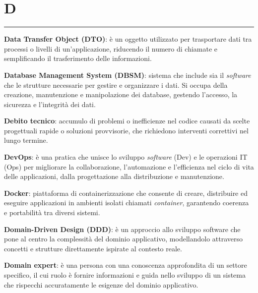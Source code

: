 \section*{D}
{\color{lightgray}\rule{\textwidth}{0.4pt}} %
\begin{glossaryitemize}
    \item \textbf{Data Transfer Object (DTO)}:  è un oggetto utilizzato per trasportare dati tra processi o livelli di un'applicazione, riducendo il numero di chiamate e semplificando il trasferimento delle informazioni.
    \item \textbf{Database Management System (DBSM)}: sistema che include sia il \textit{software} che le strutture necessarie per gestire e organizzare i dati. Si occupa della creazione, manutenzione e manipolazione dei database, gestendo l'accesso, la sicurezza e l'integrità dei dati.
    \item \textbf{Debito tecnico}: accumulo di problemi o inefficienze nel codice causati da scelte progettuali rapide o soluzioni provvisorie, che richiedono interventi correttivi nel lungo termine.
    \item \textbf{DevOps}: è una pratica che unisce lo sviluppo \textit{software} (Dev) e le operazioni IT (Ops) per migliorare la collaborazione, l'automazione e l'efficienza nel ciclo di vita delle applicazioni, dalla progettazione alla distribuzione e manutenzione.
    \item \textbf{Docker}: piattaforma di containerizzazione che consente di creare, distribuire ed eseguire applicazioni in ambienti isolati chiamati \textit{container}, garantendo coerenza e portabilità tra diversi sistemi.
    \item \textbf{Domain-Driven Design (DDD)}: è un approccio allo sviluppo software che pone al centro la complessità del dominio applicativo, modellandolo attraverso concetti e strutture direttamente ispirate al contesto reale.
    \item \textbf{Domain expert}: è una persona con una conoscenza approfondita di un settore specifico, il cui ruolo è fornire informazioni e guida nello sviluppo di un sistema che rispecchi accuratamente le esigenze del dominio applicativo.
\end{glossaryitemize}

